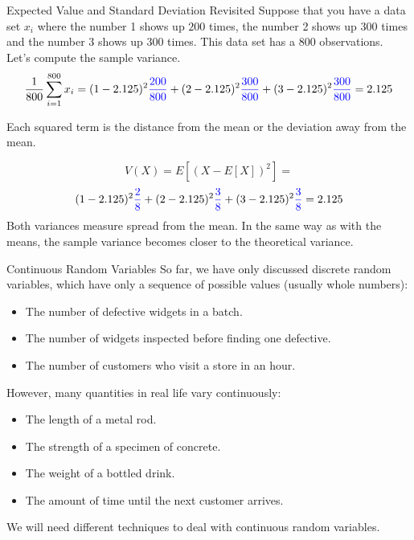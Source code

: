 \documentclass[handout]{beamer}
\newcommand{\blue}[1]{{\color{blue} #1}}
\newcommand{\nl}[1]{\vspace{#1 em}}
\begin{document}
        \begin{frame}{Expected Value and Standard Deviation Revisited}
            Suppose that you have a data set $x_i$ where the number 1 shows up $200$ times, the number 2 shows up $300$ times and the number 3 shows up $300$ times. This data set has a $800$ observations.\\ \nl{0.5}
            Let's compute the sample variance.
            $$ \frac{1}{800}\sum_{i=1}^{800} x_i = (1-2.125)^2 \blue{\frac{200}{800}} + (2- 2.125)^2 \blue{\frac{300}{800}} + (3-2.125)^2 \blue{\frac{300}{800}}= 2.125 $$
            
            Each squared term is the distance from the mean or the deviation away from the mean.  

                $$ V(X) = E[(X-E[X])^2] = $$
                $$(1-2.125)^2 \blue{\frac{2}{8}} + (2-2.125)^2 \blue{\frac{3}{8}} + (3-2.125)^2 \blue{\frac{3}{8}} = 2.125 $$
                Both variances measure spread from the mean. In the same way as with the means, the sample variance becomes closer to the theoretical variance.
            \end{frame}

\begin{frame}{Continuous Random Variables}
    So far, we have only discussed discrete random variables, which have only a sequence of possible values (usually whole numbers):
    \begin{itemize}
    \item The number of defective widgets in a batch.
    \item The number of widgets inspected before finding one defective.
    \item The number of customers who visit a store in an hour.
    \end{itemize}
    However, many quantities in real life vary continuously:
    \begin{itemize}
    \item The length of a metal rod.
    \item The strength of a specimen of concrete.
    \item The weight of a bottled drink.
    \item The amount of time until the next customer arrives.
    \end{itemize}
    We will need different techniques to deal with continuous random variables.
    \end{frame}
\end{document}
